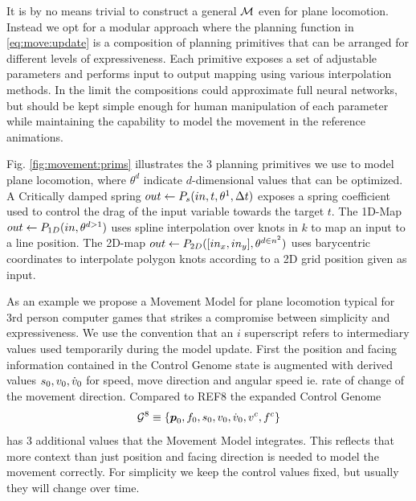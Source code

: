 It is by no means trivial to construct a general $\mathcal{M}$ even for plane locomotion. Instead we opt for a modular approach where the planning function in \ref{eq:move:update} is a composition of planning primitives that can be arranged for different levels of expressiveness. Each primitive exposes a set of adjustable parameters and performs input to output mapping using various interpolation methods. In the limit the compositions could approximate full neural networks, but should be kept simple enough for human manipulation of each parameter while maintaining the capability to model the movement in the reference animations.     

Fig. \ref{fig:movement:prims} illustrates the 3 planning primitives we use to model plane locomotion, where $\theta^d$ indicate $d$-dimensional values that can be optimized. A Critically damped spring $out\leftarrow{}P_s{(in,t,\theta^1,\Delta{t})}$ exposes a spring coefficient used to control the drag of the input variable towards the target $t$. The 1D-Map $out\leftarrow{}P_{1D}(in,\theta^{d>1})$ uses spline interpolation over knots in $k$ to map an input to a line position. The 2D-map $out\leftarrow{}P_{2D}([in_x, in_y],\theta^{d\in{n^2}})$ uses barycentric coordinates to interpolate polygon knots according to a 2D grid position given as input.    

As an example we propose a Movement Model for plane locomotion typical for 3rd person computer games that strikes a compromise between simplicity and expressiveness. We use the convention that an $i$ superscript refers to intermediary values used temporarily during the model update. First the position and facing information contained in the Control Genome state is augmented with derived values $s_0, v_0, {\dot{v}}_0$ for speed, move direction and angular speed ie. rate of change of the movement direction. Compared to REF8 the expanded Control Genome 
\begin{subequations}
\begin{align}
    \mathcal{G}^{8} \equiv \left\{ \boldsymbol{p }_0,f_0,s_0,v_0,{\dot{v}}_0,v^c,f^c \right\}
\end{align}
\end{subequations}
has 3 additional values that the Movement Model integrates. This reflects that more context than just position and facing direction is needed to model the movement correctly. For simplicity we keep the control values fixed, but usually they will change over time.

